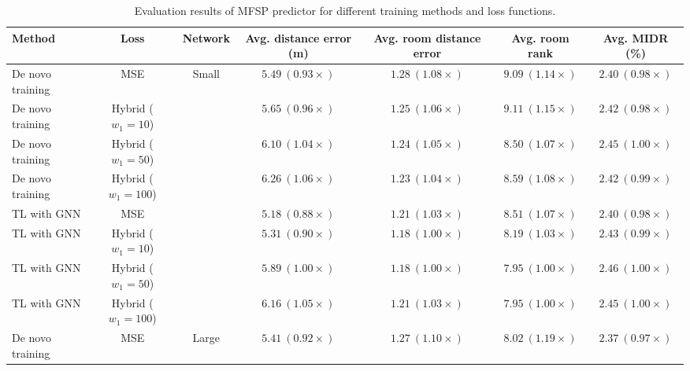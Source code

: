 \begin{table*}[h!]
    \centering
    \caption{Evaluation results of MFSP predictor for different training methods and loss functions. }
    \begin{tabular}{lcccccc}
        \toprule
        Method & Loss & Network  & Avg. distance error (m) & Avg. room distance error & Avg. room rank & Avg. MIDR (\%)  \\
        \midrule
        De novo training  & MSE               & \multirow{8}{*}{Small} & $5.49~(0.93\times)$ & $1.28~(1.08\times)$ & $9.09~(1.14\times)$ & $2.40~(0.98\times)$ \\ %
        De novo training  & Hybrid ($w_1=10$) &                        & $5.65~(0.96\times)$ & $1.25~(1.06\times)$ & $9.11~(1.15\times)$ & $2.42~(0.98\times)$ \\ %
        De novo training  & Hybrid ($w_1=50$) &                        & $6.10~(1.04\times)$ & $1.24~(1.05\times)$ & $8.50~(1.07\times)$ & $2.45~(1.00\times)$ \\ %
        De novo training  & Hybrid ($w_1=100$)&                        & $6.26~(1.06\times)$ & $1.23~(1.04\times)$ & $8.59~(1.08\times)$ & $2.42~(0.99\times)$ \\ %
        TL with GNN       & MSE               &                        & $\mathbf{5.18~(0.88\times)}$ & $1.21~(1.03\times)$ & $8.51~(1.07\times)$ & $2.40~(0.98\times)$ \\ %
        TL with GNN       & Hybrid ($w_1=10$) &                        & $5.31~(0.90\times)$ & $\mathbf{1.18~(1.00\times)}$ & $8.19~(1.03\times)$ & $2.43~(0.99\times)$ \\ %
        TL with GNN       & Hybrid ($w_1=50$) &                        & $5.89~(1.00\times)$ & $\mathbf{1.18~(1.00\times)}$ & $\mathbf{7.95~(1.00\times)}$ & $\mathbf{2.46~(1.00\times)}$ \\ %
        TL with GNN       & Hybrid ($w_1=100$)&                        & $6.16~(1.05\times)$ & $1.21~(1.03\times)$ & $\mathbf{7.95~(1.00\times)}$ & $2.45~(1.00\times)$ \\ %
        \midrule
        De novo training  & MSE               & \multirow{8}{*}{Large} & $5.41~(0.92\times)$ & $1.27~(1.10\times)$ & $8.02~(1.19\times)$ & $2.37~(0.97\times)$ \\ %

\end{tabular}
\end{table*}

